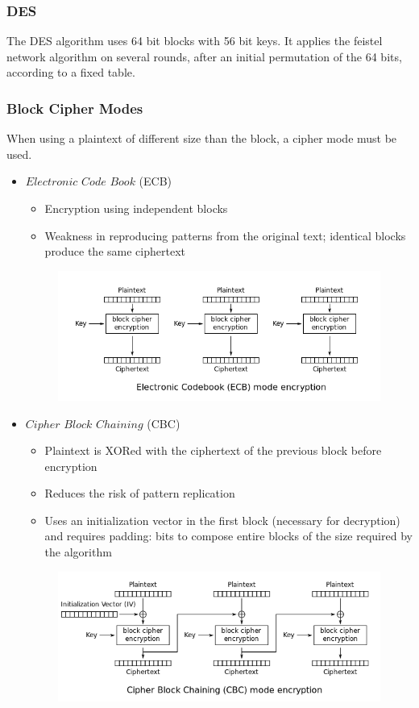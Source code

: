 \documentclass[10pt,a4paper]{report}
\begin{document}
\subsubsection{DES}
The DES algorithm uses 64 bit blocks with 56 bit keys. It applies the feistel network algorithm on several rounds, after an initial permutation of the 64 bits, according to a fixed table.
\subsubsection{Block Cipher Modes}
When using a plaintext of different size than the block, a cipher mode must be used.
\begin{itemize}
\item $Electronic$ $Code$ $Book$ (ECB)
\begin{itemize}
\item Encryption using independent blocks
\item Weakness in reproducing patterns from the original text; identical blocks produce the same ciphertext
\end{itemize}
\begin{figure}[H]
\centering
\includegraphics[scale=0.5]{4.png}
\end{figure}
\item $Cipher$ $Block$ $Chaining$ (CBC)
\begin{itemize}
\item Plaintext is XORed with the ciphertext of the previous block before encryption
\item Reduces the risk of pattern replication
\item Uses an initialization vector in the first block (necessary for decryption) and requires padding: bits to compose entire blocks of the size required by the algorithm
\end{itemize}
\begin{figure}[H]
\centering
\includegraphics[scale=0.5]{5.png}

\end{figure}
\end{itemize}
\end{document}
